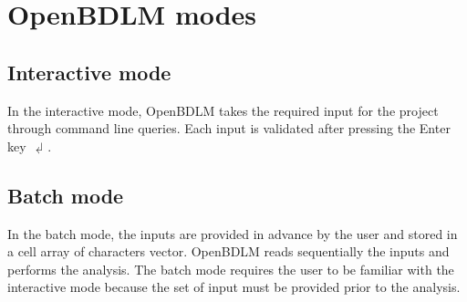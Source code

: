 \section{OpenBDLM modes}
\label{S:OPENBDLMRUNNINGMODES}

\subsection{Interactive mode}
\label{SS:InteractiveMode}

In the interactive mode, OpenBDLM takes the required input for the project through \MATLAB{} command line queries.
Each input is validated after pressing the Enter key $\dlsh$.

\subsection{Batch mode}
\label{SS:Batchmode}

In the batch mode, the inputs are provided in advance by the user and stored in a cell array of characters vector.
OpenBDLM reads sequentially the inputs and performs the analysis.  %
The batch mode requires the user to be familiar with the interactive mode because the set of input must be provided prior to the analysis.